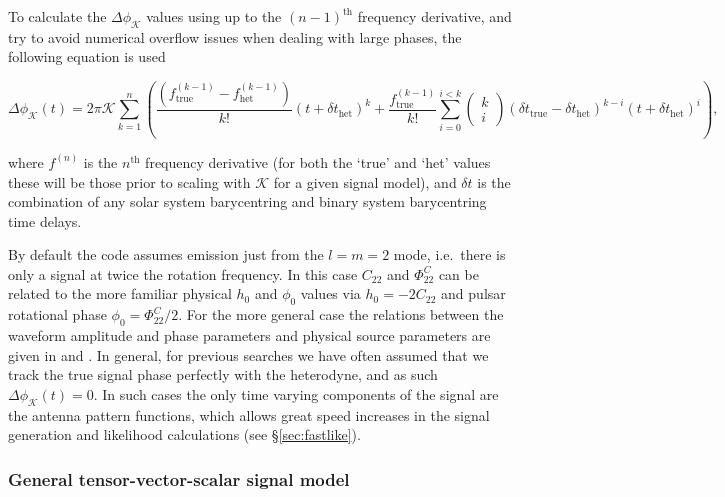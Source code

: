 To calculate the $\Delta\phi_{\mathcal{K}}$ values using up to the $(n-1)^{\text{th}}$ frequency derivative, and try to avoid numerical overflow issues when dealing
with large phases, the following equation is used
\begin{widetext}
\begin{equation}\label{eq:deltaphi}
\Delta\phi_{\mathcal{K}}(t) = 2\pi \mathcal{K} \sum_{k=1}^n \left( \frac{\left(f^{(k-1)}_{{\text{true}}} - f^{(k-1)}_{{\text{het}}}\right)}{k!}(t+\delta t_{\text{het}})^k + \frac{f^{(k-1)}_{{\text{true}}}}{k!} 
\sum_{i=0}^{i<k} \left(\begin{array}{c}k \\ i\end{array} \right) (\delta t_{\text{true}}-\delta t_{\text{het}})^{k-i} (t+\delta t_{\text{het}})^i \right),
\end{equation}
\end{widetext}
where $f^{(n)}$ is the $n^{\text{th}}$ frequency derivative (for both the `true' and `het' values these will be those prior to scaling with $\mathcal{K}$ for
a given signal model), and $\delta t$ is the combination of any solar system barycentring and binary system barycentring time delays.

By default the code assumes emission just from the $l=m=2$ mode, i.e.\ there is only a signal at twice the
rotation frequency. In this case $C_{22}$ and $\Phi_{22}^C$ can be related to the more familiar physical
$h_0$ and $\phi_0$ values via $h_0 = -2C_{22}$ \citep[where the minus sign maintains consistency of equation~\ref{eq:h2f} with the form given in][]{1998PhRvD..58f3001J} and pulsar rotational 
phase $\phi_0 = \Phi_{22}^C/2$. For the more general case the
relations between the waveform amplitude and phase parameters and physical source parameters are given in
\citet{2015arXiv150105832J} and \citet{2015MNRAS.453.4399P}. In general, for previous searches we have often assumed that we track the true
signal phase perfectly with the heterodyne, and as such $\Delta\phi_{\mathcal{K}}(t) = 0$. In such cases the only time
varying components of the signal are the antenna pattern functions, which allows great speed increases in the
signal generation and likelihood calculations (see \S\ref{sec:fastlike}).

\subsubsection{General tensor-vector-scalar signal model}

